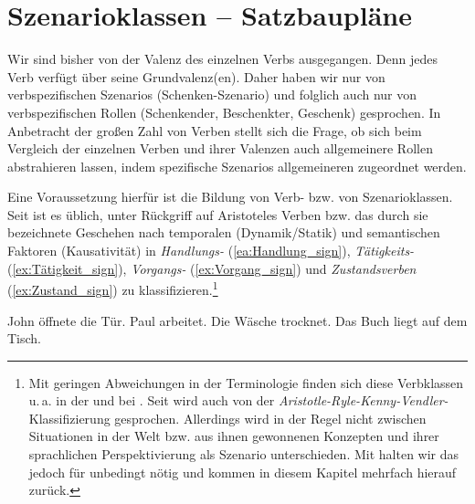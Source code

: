 \section{Szenarioklassen -- Satzbaupläne}\label{subsection:Verbklassen}

Wir sind bisher von der Valenz des einzelnen Verbs ausgegangen. Denn jedes Verb verfügt über seine Grundvalenz(en). Daher haben wir nur von verbspezifischen Szenarios (\zB Schenken-Szenario) und folglich auch nur von verbspezifischen Rollen (\zB Schenkender, Beschenkter, Geschenk) gesprochen. In Anbetracht der großen Zahl von Verben stellt sich die Frage, ob sich beim Vergleich der einzelnen Verben und ihrer Valenzen auch allgemeinere Rollen abstrahieren lassen, indem spezifische Szenarios allgemeineren zugeordnet werden.
 
Eine Voraussetzung hierfür ist die Bildung von Verb- bzw. von Szenarioklassen. Seit \citet{Vendler1957} ist es üblich, unter Rückgriff auf Aristoteles Verben bzw. das durch sie bezeichnete Geschehen nach temporalen (Dynamik/Statik) und semantischen Faktoren (Kausativität) in \textit{Handlungs-} (\ref{ea:Handlung_sign}), \textit{Tätigkeits-} (\ref{ex:Tätigkeit_sign}), \textit{Vorgangs-} (\ref{ex:Vorgang_sign}) und \textit{Zustandsverben} (\ref{ex:Zustand_sign}) zu klassifizieren.\footnote{Mit geringen Abweichungen in der Terminologie finden sich diese Verbklassen u.\,a. in der \citet[658--661, §1138--1146]{Duden2022} und bei \citet[67--68]{HelbigBuscha}. Seit \citet[51]{Dowty1979} wird auch von der \textit{Aristotle-Ryle-Kenny-Vendler-}Klassifizierung gesprochen. Allerdings wird in der Regel nicht zwischen Situationen in der Welt bzw. aus ihnen gewonnenen Konzepten und ihrer sprachlichen Perspektivierung als Szenario unterschieden. Mit \citet[92--104]{Welke2019} halten wir das jedoch für unbedingt nötig und kommen in diesem Kapitel mehrfach hierauf zurück.}

\ea \label{ea:Verbklassen_sign}
\ea \label{ea:Handlung_sign} John öffnete die Tür.
\ex \label{ex:Tätigkeit_sign} Paul arbeitet.
\ex \label{ex:Vorgang_sign} Die Wäsche trocknet.
\ex \label{ex:Zustand_sign} Das Buch liegt auf dem Tisch.
\z 
\z

